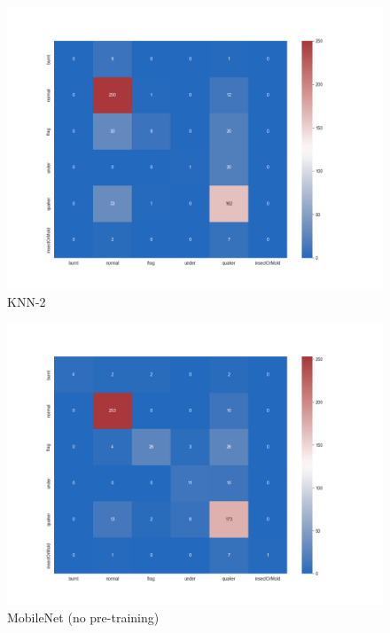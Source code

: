 \begin{figure} %
    \centering
    \includegraphics[width=\textwidth]{figures/confusionMatrices/KNN-28-neighbor-manhattan-histogram-32bins-noNorm-dimred}
    \caption{KNN-2}
    \label{fig:knn-2}
\end{figure}

\begin{figure}
    \centering
    \includegraphics[width=\textwidth]{figures/confusionMatrices/mobileNet-no-pretraining0-5gamma}
    \caption{MobileNet (no pre-training)}
    \label{fig:mobileNetNoPt}
\end{figure}


